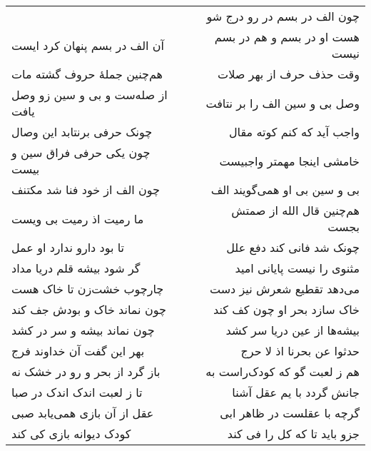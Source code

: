 \begin{center}
\begin{longtable}{l p{0.5cm} r}
&&
چون الف در بسم در رو درج شو
\\
آن الف در بسم پنهان کرد ایست
&&
هست او در بسم و هم در بسم نیست
\\
هم‌چنین جملهٔ حروف گشته مات
&&
وقت حذف حرف از بهر صلات
\\
از صله‌ست و بی و سین زو وصل یافت
&&
وصل بی و سین الف را بر نتافت
\\
چونک حرفی برنتابد این وصال
&&
واجب آید که کنم کوته مقال
\\
چون یکی حرفی فراق سین و بیست
&&
خامشی اینجا مهمتر واجبیست
\\
چون الف از خود فنا شد مکتنف
&&
بی و سین بی او همی‌گویند الف
\\
ما رمیت اذ رمیت بی ویست
&&
هم‌چنین قال الله از صمتش بجست
\\
تا بود دارو ندارد او عمل
&&
چونک شد فانی کند دفع علل
\\
گر شود بیشه قلم دریا مداد
&&
مثنوی را نیست پایانی امید
\\
چارچوب خشت‌زن تا خاک هست
&&
می‌دهد تقطیع شعرش نیز دست
\\
چون نماند خاک و بودش جف کند
&&
خاک سازد بحر او چون کف کند
\\
چون نماند بیشه و سر در کشد
&&
بیشه‌ها از عین دریا سر کشد
\\
بهر این گفت آن خداوند فرج
&&
حدثوا عن بحرنا اذ لا حرج
\\
باز گرد از بحر و رو در خشک نه
&&
هم ز لعبت گو که کودک‌راست به
\\
تا ز لعبت اندک اندک در صبا
&&
جانش گردد با یم عقل آشنا
\\
عقل از آن بازی همی‌یابد صبی
&&
گرچه با عقلست در ظاهر ابی
\\
کودک دیوانه بازی کی کند
&&
جزو باید تا که کل را فی کند
\\
\end{longtable}
\end{center}
